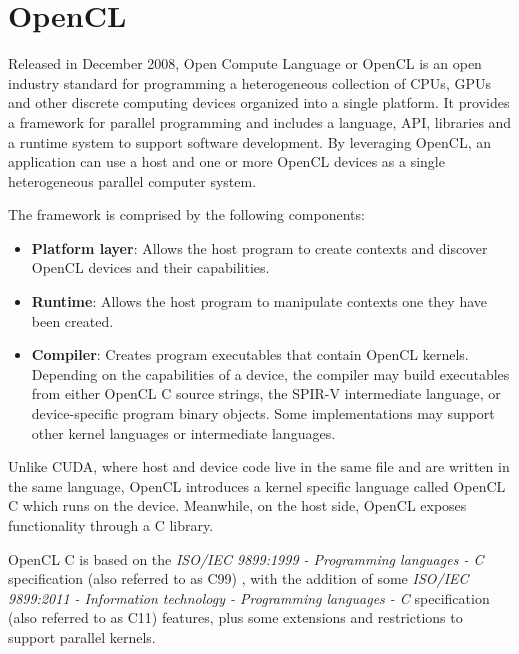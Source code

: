 \section{OpenCL} \label{sect:opencl}

Released in December 2008, Open Compute Language or OpenCL \cite{opencl_spec} is an open industry standard for programming a heterogeneous collection of CPUs, GPUs and other discrete computing devices organized into a single platform. It provides a framework for parallel programming and includes a language, API, libraries and a runtime system to support software development. By leveraging OpenCL, an application can use a host and one or more OpenCL devices as a single heterogeneous parallel computer system.

The framework is comprised by the following components:
\begin{itemize}
    \item \textbf{Platform layer}: Allows the host program to create contexts and discover OpenCL devices and their capabilities.
    \item \textbf{Runtime}: Allows the host program to manipulate contexts one they have been created.
    \item \textbf{Compiler}: Creates program executables that contain OpenCL kernels. Depending on the capabilities of a device, the compiler may build executables from either OpenCL C source strings, the SPIR-V intermediate language, or device-specific program binary objects. Some implementations may support other kernel languages or intermediate languages.
\end{itemize}

Unlike CUDA, where host and device code live in the same file and are written in the same language, OpenCL introduces a kernel specific language called OpenCL C \cite{opencl_c_spec} which runs on the device. Meanwhile, on the host side, OpenCL exposes functionality through a C library.

OpenCL C is based on the \textit{ISO/IEC 9899:1999 - Programming languages - C} specification (also referred to as C99) \cite{c99}, with the addition of some \textit{ISO/IEC 9899:2011 - Information technology - Programming languages - C} specification (also referred to as C11) \cite{c11} features, plus some extensions and restrictions to support parallel kernels.

